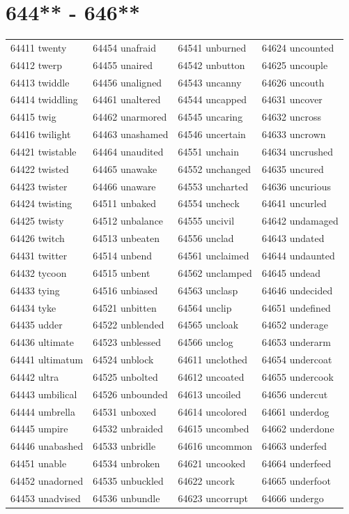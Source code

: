 \documentclass[10pt, oneside]{book}
\begin{document}
\begin{table}
	\centering
	\section*{644** - 646**}
	\begin{tabular}{l l l l}
64411 twenty &64454 unafraid &64541 unburned &64624 uncounted\\
64412 twerp &64455 unaired &64542 unbutton &64625 uncouple\\
64413 twiddle &64456 unaligned &64543 uncanny &64626 uncouth\\
64414 twiddling &64461 unaltered &64544 uncapped &64631 uncover\\
64415 twig &64462 unarmored &64545 uncaring &64632 uncross\\
64416 twilight &64463 unashamed &64546 uncertain &64633 uncrown\\
64421 twistable &64464 unaudited &64551 unchain &64634 uncrushed\\
64422 twisted &64465 unawake &64552 unchanged &64635 uncured\\
64423 twister &64466 unaware &64553 uncharted &64636 uncurious\\
64424 twisting &64511 unbaked &64554 uncheck &64641 uncurled\\
64425 twisty &64512 unbalance &64555 uncivil &64642 undamaged\\
64426 twitch &64513 unbeaten &64556 unclad &64643 undated\\
64431 twitter &64514 unbend &64561 unclaimed &64644 undaunted\\
64432 tycoon &64515 unbent &64562 unclamped &64645 undead\\
64433 tying &64516 unbiased &64563 unclasp &64646 undecided\\
64434 tyke &64521 unbitten &64564 unclip &64651 undefined\\
64435 udder &64522 unblended &64565 uncloak &64652 underage\\
64436 ultimate &64523 unblessed &64566 unclog &64653 underarm\\
64441 ultimatum &64524 unblock &64611 unclothed &64654 undercoat\\
64442 ultra &64525 unbolted &64612 uncoated &64655 undercook\\
64443 umbilical &64526 unbounded &64613 uncoiled &64656 undercut\\
64444 umbrella &64531 unboxed &64614 uncolored &64661 underdog\\
64445 umpire &64532 unbraided &64615 uncombed &64662 underdone\\
64446 unabashed &64533 unbridle &64616 uncommon &64663 underfed\\
64451 unable &64534 unbroken &64621 uncooked &64664 underfeed\\
64452 unadorned &64535 unbuckled &64622 uncork &64665 underfoot\\
64453 unadvised &64536 unbundle &64623 uncorrupt &64666 undergo\\
	\end{tabular}
 \end{table}
\clearpage
\end{document}
